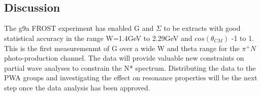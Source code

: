 \begin{figure}[htb]
\ContinuedFloat
  \begin{center} 
     \\
     \\
  \end{center}
\end{figure}




\subsection{Discussion}

The g9a FROST experiment has enabled G and $\Sigma$ to be extracts with good statistical accuracy in the range W=1.4GeV to 2.29GeV and $cos(\theta_{CM})$ -1 to 1.  This is the first measuremenmt of G over a wide W and theta range for the $\pi^+ N$ photo-production channel. The data will provide valuable new constraints on partial wave analyses to constrain the N* spectrum. Distributing the data to the PWA groups and investigating the effect on resonance properties will be the next step once the data analysis has been approved. 
